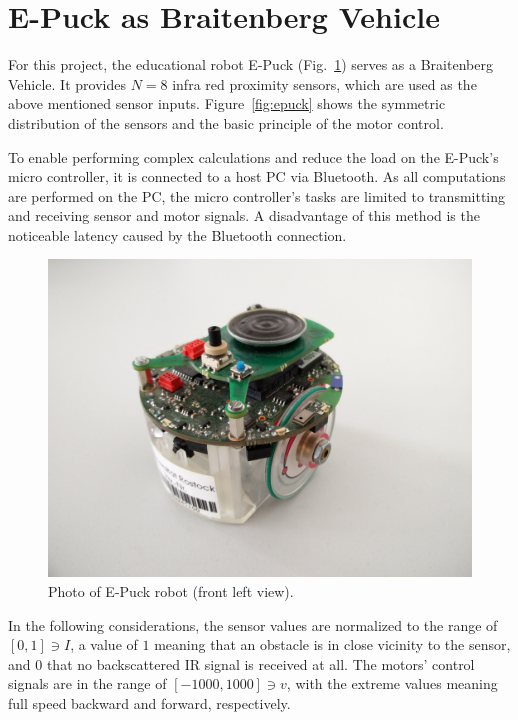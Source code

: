 \documentclass[a4paper]{jacow}
\begin{document}
\section{E-Puck as Braitenberg Vehicle}

For this project, the educational robot E-Puck (Fig.~\ref{fig:epuck_photo}) serves as a Braitenberg Vehicle. It provides $N=8$ infra red proximity sensors, which are used as the above mentioned sensor inputs. Figure~\ref{fig:epuck} shows the symmetric distribution of the sensors and the basic principle of the motor control.

To enable performing complex calculations and reduce the load on the E-Puck's micro controller, it is connected to a host PC via Bluetooth. As all computations are performed on the PC, the micro controller's tasks are limited to transmitting and receiving sensor and motor signals. A disadvantage of this method is the noticeable latency caused by the Bluetooth connection.

\begin{figure}[hbt]
	\centering
	\includegraphics[width=\linewidth]{epuck.jpg}
	\caption{Photo of E-Puck robot (front left view).}
	\label{fig:epuck_photo}
\end{figure}

In the following considerations, the sensor values are normalized to the range of $[0,1]\ni I$, a value of $1$ meaning that an obstacle is in close vicinity to the sensor, and $0$ that no backscattered IR signal is received at all. The motors' control signals are in the range of $[-1000,1000]\ni v$, with the extreme values meaning full speed backward and forward, respectively.
\end{document}
